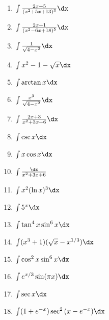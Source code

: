 \documentclass{hw}
\begin{document}
\begin{multicols}{2}
\begin{enumerate}
\item {\Large $\int{2x+5\over(x^{2}+5x+13)^{3}}\dx$}
\vspace{1cm}

\item {\Large $\int {2x+1\over(x^{2}-6x+18)^{5}}\dx$}
\vspace{1cm}

\item {\Large $\int {1\over\sqrt{4-x^{2}}}\dx$}
\vspace{1cm}

\item {\Large $\int {x^{2}-1-\sqrt{x}}\dx$}
\vspace{1cm}

\item {\Large $\int\arctan{x}\dx$}
\vspace{1cm}

\item {\Large $\int{x^{3}\over\sqrt{4-x^{2}}}\dx$}
\vspace{1cm}

\item {\Large $\int{2x+3\over x^{2}+3x+6}\dx$}
\vspace{1cm}

\item {\Large $\int\csc{x}\dx$}
\vspace{1cm}

\item {\Large $\int x\cos{x}\dx$}
\vspace{1cm}

\item {\Large $\int{\dx\over x^{2}+3x+6}$}
\vspace{1cm}

\item {\Large $\int x^{2}(\ln{x})^{3}\dx$}
\vspace{1cm}

\item {\Large $\int5^{x}\dx$}
\vspace{1cm}

\item {\Large $\int\tan^{4}{x}\sin^{6}{x}\dx$}
\vspace{1cm}

\item {\Large $\int(x^{3}+1)(\sqrt{x}-x^{1/3})\dx$}
\vspace{1cm}

\item {\Large $\int\cos^{2}{x}\sin^{6}{x}\dx$}
\vspace{1cm}

\item {\Large $\int e^{x/3}\sin(\pi x)\dx$}
\vspace{1cm}

\item {\Large $\int\sec{x}\dx$}
\vspace{1cm}

\item {\Large $\int(1+e^{-x})\sec^{2}{(x-e^{-x})}\dx$}
\vspace{1cm}

\end{enumerate}
\end{multicols}
\end{document}

